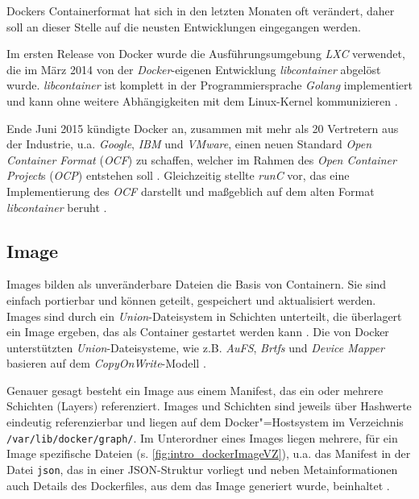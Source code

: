 \documentclass[../main.tex]{subfiles}
\begin{document}
			Dockers Containerformat hat sich in den letzten Monaten oft verändert, daher soll an dieser Stelle auf die neusten Entwicklungen eingegangen werden.

			Im ersten Release von Docker wurde die Ausführungsumgebung \emph{LXC} verwendet, die im März 2014 von der \emph{Docker}-eigenen Entwicklung \emph{libcontainer} abgelöst wurde. \emph{libcontainer} ist komplett in der Programmiersprache \emph{Golang} implementiert und kann ohne weitere Abhängigkeiten mit dem Linux-Kernel kommunizieren \cite{dockerLibcontainer}.

			Ende Juni 2015 kündigte Docker an, zusammen mit mehr als 20 Vertretern aus der Industrie, u.a. \emph{Google}, \emph{IBM} und \emph{VMware}, einen neuen Standard \emph{Open Container Format} (\emph{\acrshort{OCF}}) zu schaffen, welcher im Rahmen des \emph{Open Container Project}s (\emph{\acrshort{OCP}}) entstehen soll \cite{dockerOCP}. Gleichzeitig stellte \emph{\acrshort{runC}} vor, das eine Implementierung des \emph{OCF} darstellt und maßgeblich auf dem alten Format \emph{libcontainer} beruht \cite{dockerRunC}\cite{dockerRunCGithub}\cite{runC}.

		\subsection{Image}
    \label{dockerImages}
			Images bilden als unveränderbare Dateien die Basis von Containern. Sie sind einfach portierbar und können geteilt, gespeichert und aktualisiert werden. Images sind durch ein \emph{Union}-Dateisystem in Schichten unterteilt, die überlagert ein Image ergeben, das als Container gestartet werden kann \cite[S.11]{dockerBook}. Die von Docker unterstützten \emph{Union}-Dateisysteme, wie z.B. \emph{AuFS}, \emph{Brtfs} und \emph{Device Mapper} basieren auf dem \emph{\gls{CopyOnWrite}}-Modell \cite[S.8]{dockerBook}\cite[S.3]{dockerIntroIEEE}\cite[S.4]{dockerSecIntro}.

			Genauer gesagt besteht ein Image aus einem Manifest, das ein oder mehrere Schichten (Layers) referenziert. Images und Schichten sind jeweils über Hashwerte eindeutig referenzierbar und liegen auf dem Docker"=Hostsystem im Verzeichnis \texttt{/var/lib/docker/graph/}. Im Unterordner eines Images liegen mehrere, für ein Image spezifische Dateien (s. \fig \ref{fig:intro_dockerImageVZ}), u.a. das Manifest in der Datei \texttt{json}, das in einer \acrshort{JSON}-Struktur vorliegt und neben Metainformationen auch Details des Dockerfiles, aus dem das Image generiert wurde, beinhaltet \cite{githubDockerGlossary}.
\end{document}
